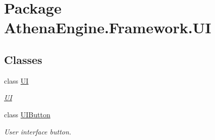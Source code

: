 \hypertarget{namespace_athena_engine_1_1_framework_1_1_u_i}{\section{Package Athena\-Engine.\-Framework.\-U\-I}
\label{namespace_athena_engine_1_1_framework_1_1_u_i}
}
\subsection*{Classes}
\begin{DoxyCompactItemize}
\item 
class \hyperlink{class_athena_engine_1_1_framework_1_1_u_i_1_1_u_i}{U\-I}
\begin{DoxyCompactList}\small\item\em \hyperlink{class_athena_engine_1_1_framework_1_1_u_i_1_1_u_i}{U\-I} \end{DoxyCompactList}\item 
class \hyperlink{class_athena_engine_1_1_framework_1_1_u_i_1_1_u_i_button}{U\-I\-Button}
\begin{DoxyCompactList}\small\item\em User interface button. \end{DoxyCompactList}\end{DoxyCompactItemize}
